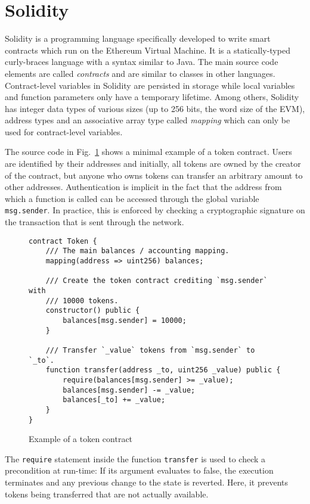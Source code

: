 \section{Solidity}
\label{section:solidity}

Solidity is a programming language specifically developed to write smart contracts
which run on the Ethereum Virtual Machine. It is a statically-typed curly-braces
language with a syntax similar to Java. The main source code elements are
called \emph{contracts} and are similar to classes in other languages.
Contract-level variables in Solidity are persisted in storage while
local variables and function parameters only have a temporary lifetime.
Among others, Solidity has integer data types of various sizes (up to 256 bits,
the word size of the EVM), address types and an associative array
type called \emph{mapping} which can only be used for contract-level variables.

The source code in Fig.~\ref{fig:tokenContract} shows a minimal example of a token contract.
Users are identified by their addresses and initially, all tokens are
owned by the creator of the contract, but
anyone who owns tokens can transfer an arbitrary amount to other addresses.
Authentication is implicit in the fact that the address from which
a function is called can be accessed through the global variable
\texttt{msg.sender}. In practice, this is enforced by checking a
cryptographic signature on the transaction that is sent through the network.

\begin{figure}
\begin{verbatim}
contract Token {
    /// The main balances / accounting mapping.
    mapping(address => uint256) balances;

    /// Create the token contract crediting `msg.sender` with
    /// 10000 tokens.
    constructor() public {
        balances[msg.sender] = 10000;
    }

    /// Transfer `_value` tokens from `msg.sender` to `_to`.
    function transfer(address _to, uint256 _value) public {
        require(balances[msg.sender] >= _value);
        balances[msg.sender] -= _value;
        balances[_to] += _value;
    }
}
\end{verbatim}
\caption{Example of a token contract}
\label{fig:tokenContract}
\end{figure}

The \texttt{require} statement inside the function \texttt{transfer} is used
to check a precondition at run-time: If its argument evaluates to false,
the execution terminates and any previous change to the state is reverted.
Here, it prevents tokens being transferred that are not actually available.


